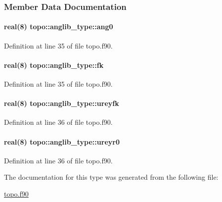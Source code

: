 \subsubsection{Member Data Documentation}
\hypertarget{structtopo_1_1anglib__type_acdca474c4c1c2bca5d41138c221c4fbc}{
\paragraph[{ang0}]{\setlength{\rightskip}{0pt plus 5cm}real(8) topo\-::anglib\-\_\-type\-::ang0}}\label{structtopo_1_1anglib__type_acdca474c4c1c2bca5d41138c221c4fbc}


Definition at line 35 of file topo.\-f90.

\hypertarget{structtopo_1_1anglib__type_a2148b48d4ddb73d38c0abf5e49f141fb}{
\paragraph[{fk}]{\setlength{\rightskip}{0pt plus 5cm}real(8) topo\-::anglib\-\_\-type\-::fk}}\label{structtopo_1_1anglib__type_a2148b48d4ddb73d38c0abf5e49f141fb}


Definition at line 35 of file topo.\-f90.

\hypertarget{structtopo_1_1anglib__type_a727cb2498aae93ce7560fafd3abbe12e}{
\paragraph[{ureyfk}]{\setlength{\rightskip}{0pt plus 5cm}real(8) topo\-::anglib\-\_\-type\-::ureyfk}}\label{structtopo_1_1anglib__type_a727cb2498aae93ce7560fafd3abbe12e}


Definition at line 36 of file topo.\-f90.

\hypertarget{structtopo_1_1anglib__type_aba95dd259df01f5547b0759a9607d9e1}{
\paragraph[{ureyr0}]{\setlength{\rightskip}{0pt plus 5cm}real(8) topo\-::anglib\-\_\-type\-::ureyr0}}\label{structtopo_1_1anglib__type_aba95dd259df01f5547b0759a9607d9e1}


Definition at line 36 of file topo.\-f90.



The documentation for this type was generated from the following file\-:\begin{DoxyCompactItemize}
\item 
\hyperlink{topo_8f90}{topo.\-f90}\end{DoxyCompactItemize}
